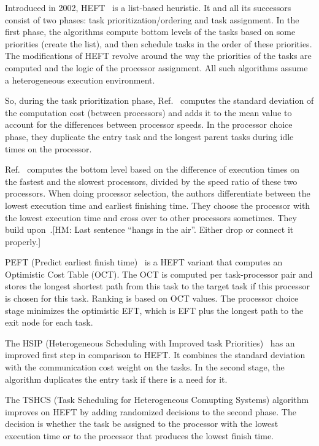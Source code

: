 \documentclass[conference]{IEEEtran}
\newcommand{\hmey}[1]{{\color{red}[HM: #1]}}
\begin{document}
    Introduced in 2002, HEFT~\cite{topcuoglu2002performance} is a list-based heuristic.
    It and all its successors consist of two phases: task prioritization/ordering and task assignment.
    In the first phase, the algorithms compute bottom levels of the tasks based on some priorities (create the list),
    and then schedule tasks in the order of these priorities.
    The modifications of HEFT revolve around the way the priorities of the tasks are computed and the logic of the processor assignment.
    All such algorithms assume a heterogeneous execution environment.

    So, during the task prioritization phase, Ref.~\cite{sulaiman2021hybrid} computes the standard deviation of the computation cost
    (between processors) and adds it to the mean value to account for the differences between processor speeds.
    In the processor choice phase, they duplicate the entry task and the longest parent tasks during idle times on the processor.

    Ref.~\cite{alebrahim2017task} computes the bottom level based on the difference of execution times on
    the fastest and the slowest processors, divided by the speed ratio of these two processors.
    When doing processor selection, the authors differentiate between the lowest execution time and earliest finishing time.
    They choose the processor with the lowest execution time and cross over to other processors sometimes.
    They build upon~\cite{shetti2013optimization}.\hmey{Last sentence ``hangs in the air''. Either drop or connect it properly.}

    PEFT (Predict earliest finish time)~\cite{arabnejad2014list} is a HEFT variant that computes an Optimistic
    Cost Table (OCT).
    The OCT is computed per task-processor pair and stores the longest shortest path from this task to the target task if this
    processor is chosen for this task.
    Ranking is based on OCT values.
    The processor choice stage minimizes the optimistic EFT, which is EFT plus the longest path to the exit node for each task.

    The HSIP (Heterogeneous Scheduling with Improved task Priorities)~\cite{wang2016hsip} has an improved first step in
    comparison to HEFT.
    It combines the standard deviation with the communication cost weight on the tasks.
    In the second stage, the algorithm duplicates the entry task if there is a need for it.

    The TSHCS (Task Scheduling for Heterogeneous Comupting Systems) algorithm~\cite{alebrahim2017task} improves on HEFT
    by adding randomized decisions to the second phase.
    The decision is whether the task be assigned to the processor with the lowest execution time or to the processor that
    produces the lowest finish time.
\end{document}
